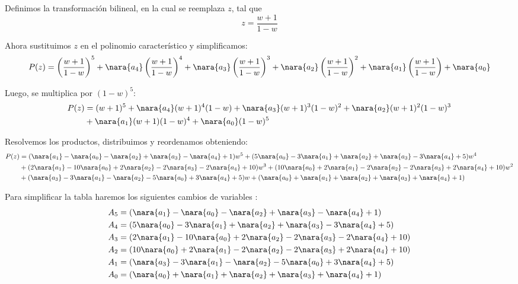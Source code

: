 Definimos la transformación bilineal, en la cual se reemplaza $z$, tal que 
\begin{equation}
    z = \frac{w+1}{1-w}
\end{equation}

Ahora sustituimos $z$ en el polinomio característico y simplificamos:
\begin{equation}
    P(z) = \left(\frac{w+1}{1-w}\right)^5 +\nara{a_4}\left(\frac{w+1}{1-w}\right)^4 + \nara{a_3}\left(\frac{w+1}{1-w}\right)^3
    + \nara{a_2} \left(\frac{w+1}{1-w}\right)^2 + \nara{a_1} \left(\frac{w+1}{1-w}\right) + \nara{a_0}
\end{equation}

Luego, se multiplica por $(1-w)^5$:
\begin{align}
    P(z) &=  ({w+1})^5 +\nara{a_4}({w+1})^4(1-w)+ \nara{a_3}({w+1})^3(1-w)^2 + \nara{a_2} ({w+1})^2 (1-w)^3 \\
    &+ \nara{a_1} ({w+1})(1-w)^4+ \nara{a_0}(1-w)^5
\end{align}

Resolvemos los productos, distribuimos y reordenamos obteniendo:
\begin{align}
  P(z) &= (\nara{a_1} - \nara{a_0} - \nara{a_2} + \nara{a_3} - \nara{a_4} + 1) w^5 + (5\nara{a_0} - 3\nara{a_1} + \nara{a_2} + \nara{a_3} - 3\nara{a_4} + 5) w^4 \\
  &+ (2\nara{a_1} - 10\nara{a_0} + 2\nara{a_2} - 2\nara{a_3} - 2\nara{a_4} + 10) w^3 + (10\nara{a_0} + 2\nara{a_1} - 2\nara{a_2} - 2\nara{a_3} + 2\nara{a_4} + 10) w^2 \\
  &+ (\nara{a_3} - 3\nara{a_1} - \nara{a_2} - 5\nara{a_0} + 3\nara{a_4} + 5) w + (\nara{a_0} + \nara{a_1} + \nara{a_2} + \nara{a_3} + \nara{a_4} + 1)
\end{align}

Para simplificar la tabla haremos los siguientes cambios de variables :
\begin{align}
    A_5&= (\nara{a_1} - \nara{a_0} - \nara{a_2} + \nara{a_3} - \nara{a_4} + 1)\\
    A_4 &=(5\nara{a_0} - 3\nara{a_1} + \nara{a_2} + \nara{a_3} - 3\nara{a_4} + 5) \\
    A_3 &= (2\nara{a_1} - 10\nara{a_0} + 2\nara{a_2} - 2\nara{a_3} - 2\nara{a_4} + 10)\\
    A_2 &=(10\nara{a_0} + 2\nara{a_1} - 2\nara{a_2} - 2\nara{a_3} + 2\nara{a_4} + 10)\\
    A_1 &=(\nara{a_3} - 3\nara{a_1} - \nara{a_2} - 5\nara{a_0} + 3\nara{a_4} + 5)\\
    A_0 &= (\nara{a_0} + \nara{a_1} + \nara{a_2} + \nara{a_3} + \nara{a_4} + 1)
\end{align}

